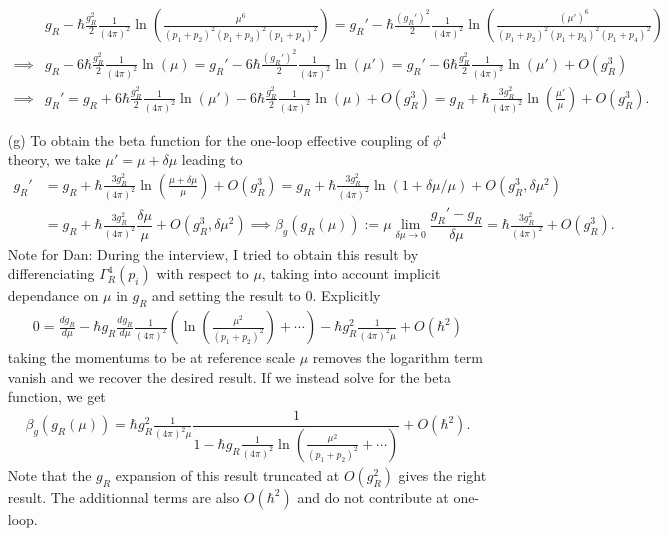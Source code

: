 \documentclass[10pt, a4paper]{article}
\begin{document}
\begin{enumerate}
  \begin{align*}
    &g_R - \hbar \frac{g_R^2}{2}\frac{1}{(4\pi)^2}\ln\left(\frac{\mu^6}{(p_1 + p_2)^2 (p_1 + p_3)^2 (p_1 + p_4)^2}\right)  = g_R' - \hbar \frac{(g_R')^2}{2}\frac{1}{(4\pi)^2}\ln\left(\frac{(\mu')^6}{(p_1 + p_2)^2 (p_1 + p_3)^2 (p_1 + p_4)^2}\right)\\
    \implies &g_R - 6\hbar \frac{g_R^2}{2}\frac{1}{(4\pi)^2}\ln\left(\mu\right)  = g_R' - 6\hbar \frac{(g_R')^2}{2}\frac{1}{(4\pi)^2}\ln\left(\mu'\right) =  g_R' - 6\hbar \frac{g_R^2}{2}\frac{1}{(4\pi)^2}\ln\left(\mu'\right) + O(g_R^3)\\
    \implies  &  g_R' = g_R + 6\hbar \frac{g_R^2}{2}\frac{1}{(4\pi)^2}\ln\left(\mu'\right) - 6\hbar \frac{g_R^2}{2}\frac{1}{(4\pi)^2}\ln\left(\mu\right) + O(g_R^3) =  g_R + \hbar \frac{3g_R^2}{(4\pi)^2}\ln\left(\frac{\mu'}{\mu}\right)  + O(g_R^3). 
  \end{align*}
  \item[(g)] To obtain the beta function for the one-loop effective coupling of $\phi^4$ theory, we take $\mu' = \mu + \delta \mu$ leading to 
  \begin{align*}
    g_R' &=  g_R + \hbar \frac{3g_R^2}{(4\pi)^2}\ln\left(\frac{\mu+\delta \mu}{\mu}\right)  + O(g_R^3) = g_R + \hbar \frac{3g_R^2}{(4\pi)^2}\ln\left(1 + \delta \mu/\mu\right)  + O(g_R^3, \delta \mu^2)\\
    &=  g_R + \hbar \frac{3g_R^2}{(4\pi)^2} \dfrac{\delta \mu}{\mu}  + O(g_R^3, \delta \mu^2) \implies \beta_g(g_R(\mu)) := \mu \lim_{\delta\mu \to 0}\dfrac{g_R' - g_R}{\delta \mu} = \hbar \frac{3g_R^2}{(4\pi)^2} + O(g_R^3). 
  \end{align*}
  Note for Dan: During the interview, I tried to obtain this result by differenciating $\Gamma^{4}_R(p_i)$ with respect to $\mu$, taking into account implicit dependance on $\mu$ in $g_R$ and setting the result to $0$. Explicitly
  \begin{align*}
   0 = \frac{d g_R}{d\mu} - \hbar g_R\frac{d g_R}{d\mu}\frac{1}{(4\pi)^2}\left(\ln\left(\frac{\mu^2}{(p_1 + p_2)^2}\right) + \cdots\right) - \hbar g_R^2 \frac{1}{(4\pi)^2 \mu} + O(\hbar^2)
  \end{align*}
  taking the momentums to be at reference scale $\mu$ removes the logarithm term vanish and we recover the desired result. If we instead solve for the beta function, we get 
  \begin{align*}
    \beta_g(g_R(\mu)) = \hbar g_R^2 \frac{1}{(4\pi)^2 \mu} \dfrac{1}{1-\hbar g_R\frac{1}{(4\pi)^2}\ln\left(\frac{\mu^2}{(p_1 + p_2)^2}+ \cdots\right)} + O(\hbar^2).
   \end{align*}
  Note that the $g_R$ expansion of this result truncated at $O(g_R^2)$ gives the right result. The additionnal terms are also $O(\hbar^2)$ and do not contribute at one-loop. 


\end{enumerate}
\end{document}
